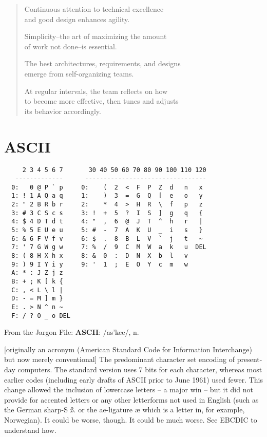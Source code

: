 \documentclass[10pt,twoside,openright]{memoir}
\begin{document}
\begin{verse}
Continuous attention to technical excellence \\
and good design enhances agility.

Simplicity--the art of maximizing the amount \\
of work not done--is essential.

The best architectures, requirements, and designs \\
emerge from self-organizing teams.

At regular intervals, the team reflects on how \\
to become more effective, then tunes and adjusts \\
its behavior accordingly.  
\end{verse}


\chapter{ASCII}

{\footnotesize
\begin{verbatim}
     2 3 4 5 6 7       30 40 50 60 70 80 90 100 110 120
   -------------      ---------------------------------
  0:   0 @ P ` p     0:    (  2  <  F  P  Z  d   n   x
  1: ! 1 A Q a q     1:    )  3  =  G  Q  [  e   o   y
  2: " 2 B R b r     2:    *  4  >  H  R  \  f   p   z
  3: # 3 C S c s     3: !  +  5  ?  I  S  ]  g   q   {
  4: $ 4 D T d t     4: "  ,  6  @  J  T  ^  h   r   |
  5: % 5 E U e u     5: #  -  7  A  K  U  _  i   s   }
  6: & 6 F V f v     6: $  .  8  B  L  V  `  j   t   ~
  7: ' 7 G W g w     7: %  /  9  C  M  W  a  k   u  DEL
  8: ( 8 H X h x     8: &  0  :  D  N  X  b  l   v
  9: ) 9 I Y i y     9: '  1  ;  E  O  Y  c  m   w
  A: * : J Z j z
  B: + ; K [ k {
  C: , < L \ l |
  D: - = M ] m }
  E: . > N ^ n ~
  F: / ? O _ o DEL  
\end{verbatim}
}

\noindent From the Jargon File: \textbf{ASCII}: /as'kee/, n.

[originally an acronym (American Standard Code for Information Interchange) but now merely conventional] The predominant character set encoding of present-day computers. The standard version uses 7 bits for each character, whereas most earlier codes (including early drafts of ASCII prior to June 1961) used fewer. This change allowed the inclusion of lowercase letters -- a major win -- but it did not provide for accented letters or any other letterforms not used in English (such as the German sharp-S {\ss}. or the ae-ligature {\ae} which is a letter in, for example, Norwegian). It could be worse, though. It could be much worse. See EBCDIC to understand how.
\end{document}
